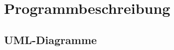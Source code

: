 \chapter{Programmbeschreibung}\label{ch:programmbeschreibung}


\section{UML-Diagramme}\label{sec:uml}

\noindent%
\begin{minipage}{\linewidth}%
    \label{fig:klassen-dia}
\end{minipage}

